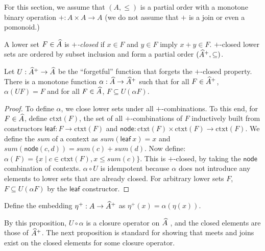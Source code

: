 For this section, we assume that $(A, \leq)$ is a partial order with a
monotone binary operation $+ : A \times A \to A$ (we do not assume
that $+$ is a join or even a pomonoid.)

\begin{definition}
  A lower set $F \in \widehat{A}$ is \emph{$+$-closed} if $x \in F$
  and $y \in F$ imply $x + y \in F$. $+$-closed lower sets are ordered
  by subset inclusion and form a partial order
  $(\widehat{A}^+, \subseteq)$.
\end{definition}

\begin{proposition}
  Let $U : \widehat{A}^+ \to \widehat{A}$ be the ``forgetful''
  function that forgets the $+$-closed property. There is a monotone
  function $\alpha : \widehat{A} \to \widehat{A}^+$ such that
  for all $F \in \widehat{A}^+$, $\alpha(U F) = F$ and for all
  $F \in \widehat{A}$, $F \subseteq U (\alpha F)$.
\end{proposition}

\begin{proof}
  To define $\alpha$, we close lower sets under all
  $+$-combinations. To this end, for $F \in \widehat{A}$, define
  $\mathrm{ctxt}(F)$, the set of all $+$-combinations of $F$
  inductively built from constructors
  $\mathsf{leaf} : F \to \mathrm{ctxt}(F)$ and
  $\mathsf{node} : \mathrm{ctxt}(F) \times \mathrm{ctxt}(F) \to
  \mathrm{ctxt}(F)$. We define the \emph{sum} of a context as
  $\mathit{sum}(\mathsf{leaf}~x) = x$ and
  $\mathit{sum}(\mathsf{node}(c,d)) = \mathit{sum}(c) +
  \mathit{sum}(d)$. Now define:
  $\alpha(F) = \{ x \mid c \in \mathrm{ctxt}(F), x \leq
  \mathit{sum}(c) \}$. This is $+$-closed, by taking the
  $\mathsf{node}$ combination of contexts. $\alpha \circ U$ is
  idempotent because $\alpha$ does not introduce any elements to lower
  sets that are already closed. For arbitrary lower sets $F$,
  $F \subseteq U(\alpha F)$ by the $\mathsf{leaf}$ constructor.
\end{proof}

\begin{definition}
  Define the embedding $\eta^+ : A \to \widehat{A}^+$ as
  $\eta^+(x) = \alpha(\eta(x))$.
\end{definition}

\begin{remark}
  By this proposition, $U \circ \alpha$ is a closure operator on
  $\widehat{A}$ \cite{davey-priestley}, and the closed elements are
  those of $\widehat{A}^+$. The next proposition is standard for
  showing that meets and joins exist on the closed elements for some
  closure operator.
\end{remark}


